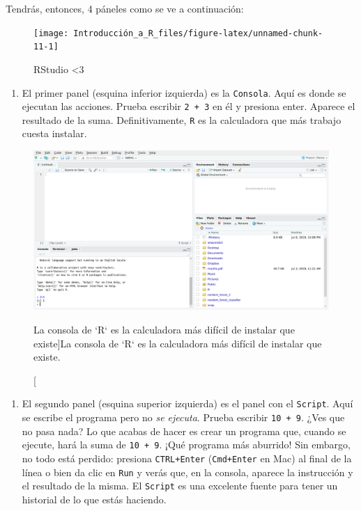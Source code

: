 \documentclass[]{tufte-book}
\providecommand{\tightlist}{%
  \setlength{\itemsep}{0pt}\setlength{\parskip}{0pt}}
\begin{document}
Tendrás, entonces, 4 páneles como se ve a continuación:

\begin{figure}
\texttt{[image: Introducción\_a\_R\_files/figure-latex/unnamed-chunk-11-1]} \caption[RStudio <3]{RStudio <3}\label{fig:unnamed-chunk-11}
\end{figure}

\begin{enumerate}
\def\labelenumi{\arabic{enumi}.}
\tightlist
\item
  El primer panel (esquina inferior izquierda) es la \texttt{Consola}.
  Aquí es donde se ejecutan las acciones. Prueba escribir
  \texttt{2\ +\ 3} en él y presiona enter. Aparece el resultado de la
  suma. Definitivamente, \texttt{R} es la calculadora que más trabajo
  cuesta instalar.
\end{enumerate}

\begin{figure}
\includegraphics[width=40in]{images/RStudio4} \caption[La consola de `R` es la calculadora más difícil de instalar que existe]{La consola de `R` es la calculadora más difícil de instalar que existe.}\label{fig:unnamed-chunk-12}
\end{figure}

\begin{enumerate}
\def\labelenumi{\arabic{enumi}.}
\setcounter{enumi}{1}
\tightlist
\item
  El segundo panel (esquina superior izquierda) es el panel con el
  \texttt{Script}. Aquí se escribe el programa pero no \emph{se
  ejecuta}. Prueba escribir \texttt{10\ +\ 9}. ¿Ves que no pasa nada? Lo
  que acabas de hacer es crear un programa que, cuando se ejecute, hará
  la suma de \texttt{10\ +\ 9}. ¡Qué programa más aburrido! Sin embargo,
  no todo está perdido: presiona \texttt{CTRL+Enter} (\texttt{Cmd+Enter}
  en Mac) al final de la línea o bien da clic en \texttt{Run} y verás
  que, en la consola, aparece la instrucción y el resultado de la misma.
  El \texttt{Script} es una excelente fuente para tener un historial de
  lo que estás haciendo.
\end{enumerate}
\end{document}
